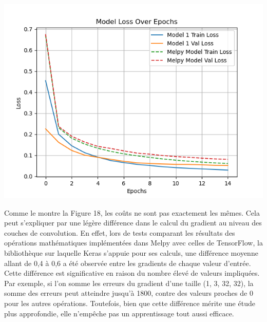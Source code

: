 \begin{multicols}{2}
\includegraphics[width=\columnwidth]{images/mnist_comparison.png}
\hfill\break

Comme le montre la Figure 18, les coûts ne sont pas exactement les mêmes. Cela peut s’expliquer par une légère différence 
dans le calcul du gradient au niveau des couches de convolution. En effet, lors de tests comparant les résultats des opérations 
mathématiques implémentées dans Melpy avec celles de TensorFlow, la bibliothèque sur laquelle Keras s’appuie pour ses calculs, 
une différence moyenne allant de 0,4 à 0,6 a été observée entre les gradients de chaque valeur d’entrée. Cette différence est 
significative en raison du nombre élevé de valeurs impliquées. Par exemple, si l’on somme les erreurs du gradient d’une taille (1, 3, 32, 32), 
la somme des erreurs peut atteindre jusqu’à 1800, contre des valeurs proches de 0 pour les autres opérations. 
Toutefois, bien que cette différence mérite une étude plus approfondie, elle n’empêche pas un apprentissage tout aussi efficace. \\


\end{multicols}